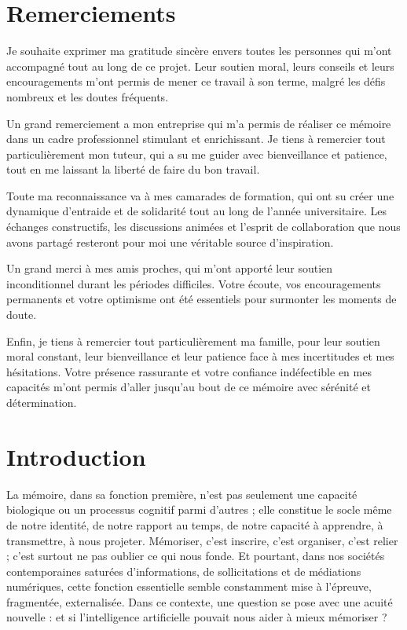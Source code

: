 \documentclass[11pt,a4paper]{report}
\begin{document}
\chapter*{Remerciements}

Je souhaite exprimer ma gratitude sincère envers toutes les personnes qui m’ont accompagné tout au long de ce projet. Leur soutien moral, leurs conseils et leurs encouragements m’ont permis de mener ce travail à son terme, malgré les défis nombreux et les doutes fréquents.

Un grand remerciement a mon entreprise qui m’a permis de réaliser ce mémoire dans un cadre professionnel stimulant et enrichissant. Je tiens à remercier tout particulièrement mon tuteur, qui a su me guider avec bienveillance et patience, tout en me laissant la liberté de faire du bon travail.

Toute ma reconnaissance va à mes camarades de formation, qui ont su créer une dynamique d’entraide et de solidarité tout au long de l'année universitaire. Les échanges constructifs, les discussions animées et l’esprit de collaboration que nous avons partagé resteront pour moi une véritable source d’inspiration.

Un grand merci à mes amis proches, qui m’ont apporté leur soutien inconditionnel durant les périodes difficiles. Votre écoute, vos encouragements permanents et votre optimisme ont été essentiels pour surmonter les moments de doute.

Enfin, je tiens à remercier tout particulièrement ma famille, pour leur soutien moral constant, leur bienveillance et leur patience face à mes incertitudes et mes hésitations. Votre présence rassurante et votre confiance indéfectible en mes capacités m’ont permis d’aller jusqu’au bout de ce mémoire avec sérénité et détermination.

\chapter*{Introduction}

La mémoire, dans sa fonction première, n’est pas seulement une capacité biologique ou un processus cognitif parmi d’autres ; elle constitue le socle même de notre identité, de notre rapport au temps, de notre capacité à apprendre, à transmettre, à nous projeter. Mémoriser, c’est inscrire, c’est organiser, c’est relier ; c’est surtout ne pas oublier ce qui nous fonde. Et pourtant, dans nos sociétés contemporaines saturées d’informations, de sollicitations et de médiations numériques, cette fonction essentielle semble constamment mise à l’épreuve, fragmentée, externalisée. Dans ce contexte, une question se pose avec une acuité nouvelle : et si l’intelligence artificielle pouvait nous aider à mieux mémoriser ?
\end{document}
